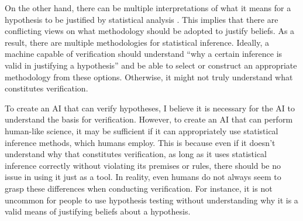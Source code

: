 On the other hand, there can be multiple interpretations of what it means for a hypothesis to be justified by statistical analysis \cite{otsuka2022thinking}. This implies that there are conflicting views on what methodology should be adopted to justify beliefs. As a result, there are multiple methodologies for statistical inference. Ideally, a machine capable of verification should understand ``why a certain inference is valid in justifying a hypothesis''  and be able to select or construct an appropriate methodology from these options. Otherwise, it might not truly understand what constitutes verification.

To create an AI that can verify hypotheses, I believe it is necessary for the AI to understand the basis for verification. However, to create an AI that can perform human-like science, it may be sufficient if it can appropriately use statistical inference methods, which humans employ. This is because even if it doesn't understand why that constitutes verification, as long as it uses statistical inference correctly without violating its premises or rules, there should be no issue in using it just as a tool. In reality, even humans do not always seem to grasp these differences when conducting verification. For instance, it is not uncommon for people to use hypothesis testing without understanding why it is a valid means of justifying beliefs about a hypothesis. 



